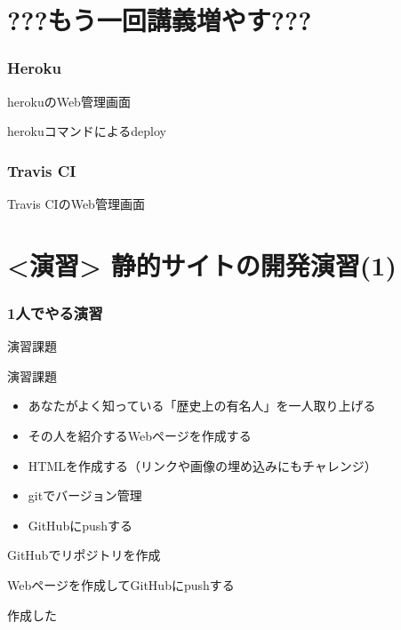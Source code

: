 \documentclass[t, aspectratio=169]{beamer}
\begin{document}
\part{???もう一回講義増やす???}
\label{sec-7}
\section{Heroku}
\label{sec-7-1}
\begin{frame}[label=sec-7-1-1]{herokuのWeb管理画面}
\end{frame}
\begin{frame}[label=sec-7-1-2]{herokuコマンドによるdeploy}
\end{frame}
\section{Travis CI}
\label{sec-7-2}
\begin{frame}[label=sec-7-2-1]{Travis CIのWeb管理画面}
\end{frame}
\part{<演習> 静的サイトの開発演習(1)}
\label{sec-8}
\section{1人でやる演習}
\label{sec-8-1}
\begin{frame}[label=sec-8-1-1]{演習課題}
\begin{block}{演習課題}
\begin{itemize}
\item あなたがよく知っている「歴史上の有名人」を一人取り上げる
\item その人を紹介するWebページを作成する
\item HTMLを作成する（リンクや画像の埋め込みにもチャレンジ）
\item gitでバージョン管理
\item GitHubにpushする
\end{itemize}
\end{block}
\end{frame}
\begin{frame}[label=sec-8-1-2]{}
\end{frame}
\begin{frame}[label=sec-8-1-3]{GitHubでリポジトリを作成}
\end{frame}
\begin{frame}[label=sec-8-1-4]{Webページを作成してGitHubにpushする}
\end{frame}
\begin{frame}[label=sec-8-1-5]{作成した}
\end{frame}
\end{document}
